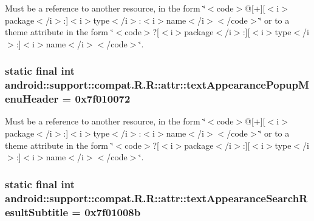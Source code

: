 Must be a reference to another resource, in the form \char`\"{}$<$code$>$@\mbox{[}+\mbox{]}\mbox{[}$<$i$>$package$<$/i$>$:\mbox{]}$<$i$>$type$<$/i$>$:$<$i$>$name$<$/i$>$$<$/code$>$\char`\"{} or to a theme attribute in the form \char`\"{}$<$code$>$?\mbox{[}$<$i$>$package$<$/i$>$:\mbox{]}\mbox{[}$<$i$>$type$<$/i$>$:\mbox{]}$<$i$>$name$<$/i$>$$<$/code$>$\char`\"{}. \hypertarget{classandroid_1_1support_1_1compat_1_1_r_1_1attr_e122b3fc4fde26c24cddd50a80036c7c}{
\subsubsection[{textAppearancePopupMenuHeader}]{\setlength{\rightskip}{0pt plus 5cm}static final int android::support::compat.R.R::attr::textAppearancePopupMenuHeader = 0x7f010072}}
\label{classandroid_1_1support_1_1compat_1_1_r_1_1attr_e122b3fc4fde26c24cddd50a80036c7c}


Must be a reference to another resource, in the form \char`\"{}$<$code$>$@\mbox{[}+\mbox{]}\mbox{[}$<$i$>$package$<$/i$>$:\mbox{]}$<$i$>$type$<$/i$>$:$<$i$>$name$<$/i$>$$<$/code$>$\char`\"{} or to a theme attribute in the form \char`\"{}$<$code$>$?\mbox{[}$<$i$>$package$<$/i$>$:\mbox{]}\mbox{[}$<$i$>$type$<$/i$>$:\mbox{]}$<$i$>$name$<$/i$>$$<$/code$>$\char`\"{}. \hypertarget{classandroid_1_1support_1_1compat_1_1_r_1_1attr_f35cc0e9e7d2b5e1c2c9b9bccd1930f8}{
\subsubsection[{textAppearanceSearchResultSubtitle}]{\setlength{\rightskip}{0pt plus 5cm}static final int android::support::compat.R.R::attr::textAppearanceSearchResultSubtitle = 0x7f01008b}}
\label{classandroid_1_1support_1_1compat_1_1_r_1_1attr_f35cc0e9e7d2b5e1c2c9b9bccd1930f8}


